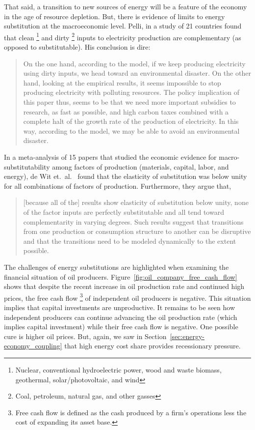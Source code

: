 That said, a transition to new sources of energy will be a feature 
of the economy in the age of resource depletion.
But, there is evidence of limits to energy substitution 
at the macroeconomic level.
Pelli, in a study of 21 countries 
found that clean%
	\footnote{
	Nuclear, 
	conventional hydroelectric power, wood and waste biomass, 
	geothermal, solar/photovoltaic, and wind
	}
and dirty%
	\footnote{
	Coal, 
	petroleum, natural gas, and other gasses
	}
inputs to electricity production
are complementary (as opposed to substitutable).\cite{Pelli:2012wv}
His conclusion is dire:
%
\begin{quote}
	On the one hand, according to the model, 
	if we keep producing electricity using dirty inputs, 
	we head toward an environmental disaster. 
	On the other hand, looking at the empirical results, 
	it seems impossible to stop producing electricity with polluting resources. 
	The policy implication of this paper thus, 
	seems to be that we need more important subsidies to research, 
	as fast as possible, 
	and high carbon taxes combined with a complete halt 
	of the growth rate of the production of electricity. 
	In this way, according to the model, 
	we may be able to avoid an environmental disaster.\cite[p.~25]{Pelli:2012wv}
\end{quote}

In a meta-analysis of 15 papers that studied 
the economic evidence for macro-substitutability
among factors of production (materials, capital, labor, and energy), 
de Wit et.\ al.~\cite{de-Wit:2013aa} found that the elasticity of substitution was 
below unity for all combinations of factors of production.
Furthermore, they argue that, 
%
\begin{quote}
	[because all of the] results show elasticity of substitution below unity, 
	none of the factor inputs are perfectly substitutable and 
	all tend toward complementarity in varying degrees. 
	Such results suggest that transitions 
	from one production or consumption structure to another 
	can be disruptive and that the transitions 
	need to be modeled dynamically to the extent possible.\cite[p.~8]{de-Wit:2013aa}
\end{quote}

The challenges of energy substitutions are highlighted
when examining the financial situation of oil producers.
Figure~\ref{fig:oil_company_free_cash_flow} 
shows that despite the recent increase in oil production rate
and continued high prices, 
the free cash flow%
	\footnote{
	Free cash flow is defined as the cash produced by a firm's operations
	less the cost of expanding its asset base.
	}
of independent oil producers is negative.
This situation implies that capital investments are unproductive.
It remains to be seen how independent producers 
can continue advancing the oil production rate (which implies capital investment)
while their free cash flow is negative.
One possible cure is higher oil prices.
But, again, we saw 
in Section~\ref{sec:energy-economy_coupling}
that high energy cost share 
provides recessionary pressure.

